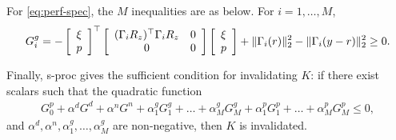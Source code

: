 \documentclass[11pt, onecolumn]{article}
\begin{document}
For \eqref{eq:perf-spec}, the $M$ inequalities are as below. For $i=1,\dots, M$,
\begin{align*}
  G^g_i= -   \left[ \begin{array}[c]{c} \xi\\ p \end{array} \right]^\top
    \left[ \begin{array}[c]{cc} (\Gamma_{i}R_z)^\top \Gamma_{i}R_z  &0 \\ 0 & 0  \end{array} \right]
  \left[ \begin{array}[c]{c} \xi\\ p \end{array} \right]
  + \|\Gamma_{i}(r)\|_2^2 -   \|\Gamma_{i}(y-r)\|_2^2 \ge 0.
\end{align*}

Finally, s-proc gives the sufficient condition for invalidating $K$: if there exist scalars such
that the quadratic function
\begin{align*}
  G^p_0 + \alpha^d G^d + \alpha^n G^n  + \alpha^g_1 G^g_1
  + \dots+ \alpha^g_M G^g_M   + \alpha^p_1 G^p_1 +\dots + \alpha^p_M G^p_M\le  0,
\end{align*}
and $\alpha^d, \alpha^n,\alpha^g_1,\dots, \alpha^g_M$ are non-negative, then $K$ is invalidated.
\end{document}

